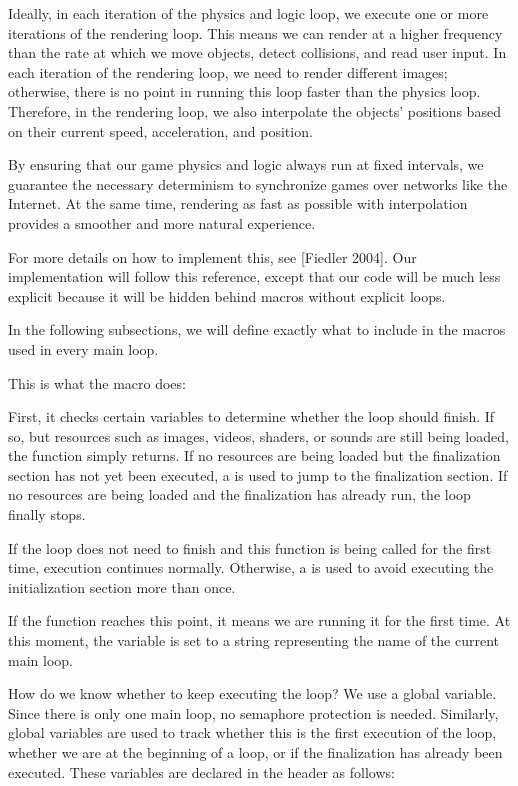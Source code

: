 Ideally, in each iteration of the physics and logic loop, we execute
one or more iterations of the rendering loop. This means we can render
at a higher frequency than the rate at which we move objects, detect
collisions, and read user input. In each iteration of the rendering
loop, we need to render different images; otherwise, there is no point
in running this loop faster than the physics loop. Therefore, in the
rendering loop, we also interpolate the objects’ positions based on
their current speed, acceleration, and position.

By ensuring that our game physics and logic always run at fixed
intervals, we guarantee the necessary determinism to synchronize games
over networks like the Internet. At the same time, rendering as fast
as possible with interpolation provides a smoother and more natural
experience.

For more details on how to implement this, see [Fiedler 2004]. Our
implementation will follow this reference, except that our code will
be much less explicit because it will be hidden behind macros without
explicit loops.

In the following subsections, we will define exactly what to include
in the macros used in every main loop.


This is what the macro  does:

First, it checks certain variables to determine whether the loop
should finish. If so, but resources such as images, videos, shaders,
or sounds are still being loaded, the function simply returns. If no
resources are being loaded but the finalization section has not yet
been executed, a  is used to jump to the finalization
section. If no resources are being loaded and the finalization has
already run, the loop finally stops.

If the loop does not need to finish and this function is being called
for the first time, execution continues normally. Otherwise,
a  is used to avoid executing the initialization
section more than once.

If the function reaches this point, it means we are running it for the
first time. At this moment, the variable  is
set to a string representing the name of the current main loop.

How do we know whether to keep executing the loop? We use a global
variable. Since there is only one main loop, no semaphore protection
is needed. Similarly, global variables are used to track whether this
is the first execution of the loop, whether we are at the beginning of
a loop, or if the finalization has already been executed. These
variables are declared in the header as follows:

